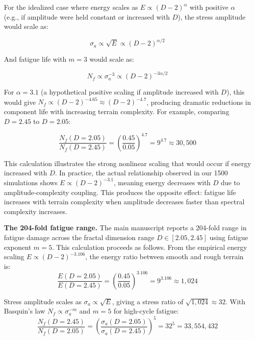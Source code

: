 \documentclass[11pt,letterpaper]{article}
\begin{document}
For the idealized case where energy scales as $E \propto (D-2)^\alpha$ with positive $\alpha$ (e.g., if amplitude were held constant or increased with $D$), the stress amplitude would scale as:

\begin{equation}
\sigma_a \propto \sqrt{E} \propto (D-2)^{\alpha/2}
\end{equation}

And fatigue life with $m = 3$ would scale as:

\begin{equation}
N_f \propto \sigma_a^{-3} \propto (D-2)^{-3\alpha/2}
\end{equation}

For $\alpha = 3.1$ (a hypothetical positive scaling if amplitude increased with $D$), this would give $N_f \propto (D-2)^{-4.65} \approx (D-2)^{-4.7}$, producing dramatic reductions in component life with increasing terrain complexity. For example, comparing $D = 2.45$ to $D = 2.05$:

\begin{equation}
\frac{N_f(D=2.05)}{N_f(D=2.45)} = \left(\frac{0.45}{0.05}\right)^{4.7} = 9^{4.7} \approx 30{,}500
\end{equation}

This calculation illustrates the strong nonlinear scaling that would occur if energy increased with $D$. In practice, the actual relationship observed in our 1500 simulations shows $E \propto (D-2)^{-3.1}$, meaning energy decreases with $D$ due to amplitude-complexity coupling. This produces the opposite effect: fatigue life increases with terrain complexity when amplitude decreases faster than spectral complexity increases.

\textbf{The 204-fold fatigue range.} The main manuscript reports a 204-fold range in fatigue damage across the fractal dimension range $D \in [2.05, 2.45]$ using fatigue exponent $m = 5$. This calculation proceeds as follows. From the empirical energy scaling $E \propto (D-2)^{-3.106}$, the energy ratio between smooth and rough terrain is:
\begin{equation}
\frac{E(D=2.05)}{E(D=2.45)} = \left(\frac{0.45}{0.05}\right)^{3.106} = 9^{3.106} \approx 1{,}024
\end{equation}

Stress amplitude scales as $\sigma_a \propto \sqrt{E}$, giving a stress ratio of $\sqrt{1{,}024} \approx 32$. With Basquin's law $N_f \propto \sigma_a^{-m}$ and $m = 5$ for high-cycle fatigue:
\begin{equation}
\frac{N_f(D=2.45)}{N_f(D=2.05)} = \left(\frac{\sigma_a(D=2.05)}{\sigma_a(D=2.45)}\right)^5 = 32^5 = 33{,}554{,}432
\end{equation}
\end{document}
